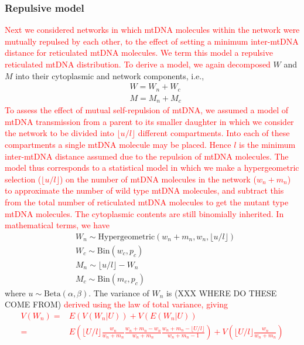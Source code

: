 \documentclass{article}
\newcommand{\be}{\begin{equation}}
\newcommand{\ee}{\end{equation}}
\begin{document}
\begin{appendices}
\subsubsection*{Repulsive model}
\textcolor{red}{Next we considered networks in which mtDNA molecules within the network were mutually repulsed by each other, to the effect of setting a minimum inter-mtDNA distance for reticulated mtDNA molecules. We term this model a repulsive reticulated mtDNA distribution. To derive a model, we again decomposed} $W$ and $M$ into their cytoplasmic and network components, i.e.,
\begin{equation*}
    \begin{split}
        & W = W_n + W_c\\
        & M = M_n + M_c
    \end{split}
\end{equation*}
\textcolor{red}{To assess the effect of mutual self-repulsion of mtDNA, we assumed a model of mtDNA transmission from a parent to its smaller daughter in which we consider the network to be divided into $\lfloor u/l \rfloor$ different compartments. Into each of these compartments a single mtDNA molecule may be placed. Hence $l$ is the minimum inter-mtDNA distance assumed due to the repulsion of mtDNA molecules. The model thus corresponds to a statistical model in which we make a hypergeometric selection ($\lfloor u/l \rfloor$) on the number of mtDNA molecules in the network ($w_n+m_n$) to approximate the number of wild type mtDNA molecules, and subtract this from the total number of reticulated mtDNA molecules to get the mutant type mtDNA molecules. The cytoplasmic contents are still binomially inherited. In mathematical terms, we have}
\be\label{eq:app-model-repel}
    \begin{split}
        & W_n \sim \mathrm{Hypergeometric}(w_n+m_n,w_n,\lfloor u/l \rfloor) \\
        & W_c \sim \mathrm{Bin}\left(w_c,p_c\right) \\
        & M_n \sim \lfloor u/l \rfloor-W_n \\
        & M_c \sim \mathrm{Bin}\left(m_c,p_c\right)
    \end{split}
\ee
where $u\sim\mathrm{Beta}(\alpha,\beta)$. The variance of $W_n$ is (XXX WHERE DO THESE COME FROM) \textcolor{red}{derived using the law of total variance, giving
\begin{equation*}
    \begin{split}
    V(W_n)=&E(V(W_n|U))+V(E(W_n|U))\\
    =&E\left(\lfloor U/l \rfloor\frac{w_n}{w_n+m_n}\frac{w_n+m_n-w_n}{w_n+m_n}\frac{w_n+m_n-\lfloor U/l \rfloor}{w_n+m_n-1}\right)+V\left(\lfloor U/l \rfloor\frac{w_n}{w_n+m_n}\right)\\

\end{split}
\end{equation*}}
\end{appendices}
\end{document}
